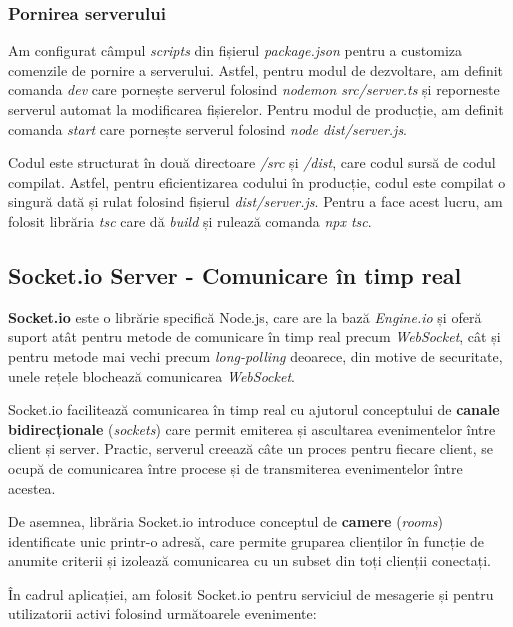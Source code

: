 \subsubsection{Pornirea serverului}
Am configurat câmpul \textit{scripts} din fișierul \textit{package.json} pentru a customiza
comenzile de pornire a serverului. Astfel, pentru modul de dezvoltare, am definit comanda
\textit{dev} care pornește serverul folosind \textit{nodemon src/server.ts} și reporneste serverul
automat la modificarea fișierelor. Pentru modul de producție, am definit comanda \textit{start}
care pornește serverul folosind \textit{node dist/server.js}.
\par
Codul este structurat în două directoare \textit{/src} și \textit{/dist}, care codul sursă de codul compilat.
Astfel, pentru eficientizarea codului în producție, codul este compilat o singură dată și rulat
folosind fișierul \textit{dist/server.js}. Pentru a face acest lucru, am folosit librăria \textit{tsc}
care dă \textit{build} și rulează comanda \textit{npx tsc}.

\subsection{Socket.io Server - Comunicare în timp real}
\label{subsec:socketio}
\textbf{Socket.io} este o librărie specifică Node.js, care are la bază \textit{Engine.io} și oferă
suport atât pentru metode de comunicare în timp real precum \textit{WebSocket}, cât și pentru metode
mai vechi precum \textit{long-polling} deoarece, din motive de securitate, unele rețele blochează
comunicarea \textit{WebSocket}. 
\par
Socket.io facilitează comunicarea în timp real cu ajutorul conceptului de \textbf{canale bidirecționale} (\textit{sockets})
care permit emiterea și ascultarea evenimentelor între client și server. Practic, serverul creează câte un proces
pentru fiecare client, se ocupă de comunicarea între procese și de transmiterea evenimentelor între acestea.
\par
De asemnea, librăria Socket.io introduce conceptul de \textbf{camere} (\textit{rooms}) identificate unic
printr-o adresă, care permite gruparea clienților în funcție de anumite criterii și izolează comunicarea cu
un subset din toți clienții conectați.
\par
În cadrul aplicației, am folosit Socket.io pentru serviciul de mesagerie și pentru utilizatorii activi folosind
următoarele evenimente:

